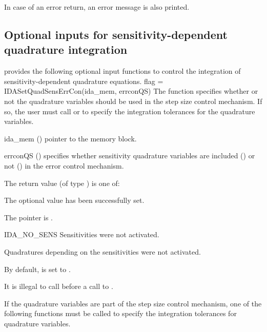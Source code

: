 {
  In case of an error return, an error message is also printed.  
}



\subsection{Optional inputs for sensitivity-dependent quadrature integration}
\label{ss:quad_sens_optional_input}
{\idas} provides the following optional input functions to control the integration
of sensitivity-dependent quadrature equations.
{
 flag = IDASetQuadSensErrCon(ida\_mem, errconQS)
}
{
  The function  specifies whether or not the
  quadrature variables should be used in the step size control
  mechanism. If so, the user must call  or
   to specify the 
  integration tolerances for the quadrature variables.  
}
{
  \begin{args}[errconQS]
  \item[ida\_mem] ()
    pointer to the {\idas} memory block.
  \item[errconQS] ()
    specifies whether sensitivity quadrature variables are included () or not
    () in the error control mechanism. 
  \end{args}
}
{
  The return value  (of type ) is one of:
  \begin{args}
  \item[\Id{IDA\_SUCCESS}] 
    The optional value has been successfully set.
  \item[\Id{IDA\_MEM\_NULL}]
    The  pointer is .
  \item[IDA\_NO\_SENS]
    Sensitivities were not activated.
  \item[\Id{IDA\_NO\_QUADSENS}] 
    Quadratures depending on the sensitivities were not activated.
  \end{args}
}
{
  By default,  is set to . 

  {\warn}It is illegal to call  before a call 
  to .
}


If the quadrature variables are part of the step size control mechanism, 
one of the following functions must be called to specify the
integration tolerances for quadrature variables. 

